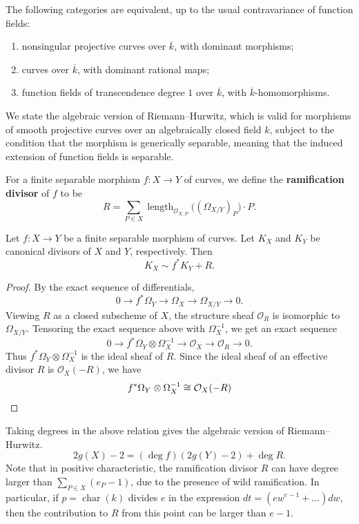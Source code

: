 \documentclass[12pt]{article}
\begin{document}
\begin{corollary}
    The following categories are equivalent, up to the usual contravariance of function fields:
    \begin{enumerate}
        \item nonsingular projective curves over $\overline{k}$, with dominant morphisms;
        \item curves over $\overline{k}$, with dominant rational maps;
        \item function fields of transcendence degree $1$ over $\overline{k}$, with $\overline{k}$-homomorphisms.
    \end{enumerate}
\end{corollary}

We state the algebraic version of Riemann--Hurwitz, which is valid for morphisms of smooth projective curves over an algebraically closed field $k$, subject to the condition that the morphism is generically separable, meaning that the induced extension of function fields is separable.

For a finite separable morphism $f:X\to Y$ of curves, we define the \textbf{ramification divisor} of $f$ to be
\[
    R=\sum_{P\in X}\operatorname{length}_{\mathcal O_{X,P}}\bigl((\Omega_{X/Y})_P\bigr)\cdot P.
\]

\begin{proposition}
    Let $f:X\to Y$ be a finite separable morphism of curves. Let $K_X$ and $K_Y$ be canonical divisors of $X$ and $Y$, respectively. Then
    \[
        K_X\sim f^*K_Y+R.
    \]
\end{proposition}

\begin{proof}
    By the exact sequence of differentials,
    \[
        0\to f^*\Omega_Y\to \Omega_X\to \Omega_{X/Y}\to 0.
    \]
    Viewing $R$ as a closed subscheme of $X$, the structure sheaf $\mathcal O_R$ is isomorphic to $\Omega_{X/Y}$. Tensoring the exact sequence above with $\Omega_X^{-1}$, we get an exact sequence
    \[
        0\to f^*\Omega_Y\otimes \Omega_X^{-1}\to \mathcal O_X\to \mathcal O_R\to 0.
    \]
    Thus $f^*\Omega_Y\otimes \Omega_X^{-1}$ is the ideal sheaf of $R$. Since the ideal sheaf of an effective divisor $R$ is $\mathcal O_X(-R)$, we have
    \[
        f^*\Omega_Y\otimes \Omega_X^{-1}\cong \mathcal O_X(-R) \qedhere
    \]
\end{proof}
Taking degrees in the above relation gives the algebraic version of Riemann--Hurwitz.
\[
    2g(X)-2=(\deg f)(2g(Y)-2)+\deg R.
\]
Note that in positive characteristic, the ramification divisor $R$ can have degree larger than $\sum_{P\in X}(e_P-1)$, due to the presence of wild ramification. In particular, if $p = \operatorname{char}(k)$ divides $e$ in the expression $dt =(e w^{e-1} + \dots)dw$, then the contribution to $R$ from this point can be larger than $e-1$.
\end{document}

